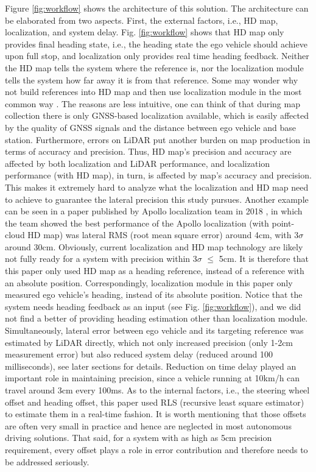 \documentclass[letterpaper, 10 pt, conference]{ieeeconf}
\begin{document}
Figure \ref{fig:workflow} shows the architecture of this solution. The architecture can be elaborated from two aspects. First, the external factors, i.e., HD map, localization, and system delay. Fig. \ref{fig:workflow} shows that HD map only provides final heading state, i.e., the heading state the ego vehicle should achieve upon full stop, and localization only provides real time heading feedback. Neither the HD map tells the system where the reference is, nor the localization module tells the system how far away it is from that reference. Some may wonder why not build references into HD map and then use localization module in the most common way \cite{Durrant2006Simultaneous, Durrantwhyte2006Simultaneous}. The reasons are less intuitive, one can think of that during map collection there is only GNSS-based localization available, which is easily affected by the quality of GNSS signals and the distance between ego vehicle and base station. Furthermore, errors on LiDAR put another burden on map production in terms of accuracy and precision. Thus, HD map's precision and accuracy are affected by both localization and LiDAR performance, and localization performance (with HD map), in turn, is affected by map's accuracy and precision. This makes it extremely hard to analyze what the localization and HD map need to achieve to guarantee the lateral precision this study pursues. Another example can be seen in a paper published by Apollo localization team in 2018 \cite{8461224}, in which the team showed the best performance of the Apollo localization (with point-cloud HD map) was lateral RMS (root mean square error) around 4cm, with 3$\sigma$ around 30cm. Obviously, current localization and HD map technology are likely not fully ready for a system with precision within 3$\sigma$ $\leq$ 5cm. It is therefore that this paper only used HD map as a heading reference, instead of a reference with an absolute position. Correspondingly, localization module in this paper only measured ego vehicle's heading, instead of its absolute position. Notice that the system needs heading feedback as an input (see Fig. \ref{fig:workflow}), and we did not find a better of providing heading estimation other than localization module. Simultaneously, lateral error between ego vehicle and its targeting reference was estimated by LiDAR directly, which not only increased precision (only 1-2cm measurement error) but also reduced system delay (reduced around 100 milliseconds), see later sections for details. Reduction on time delay played an important role in maintaining precision, since a vehicle running at 10km/h can travel around 3cm every 100ms. As to the internal factors, i.e., the steering wheel offset and heading offset, this paper used RLS (recursive least square estimator) \cite{Narayanan2014Methods} to estimate them in a real-time fashion. It is worth mentioning that those offsets are often very small in practice and hence are neglected in most autonomous driving solutions. That said, for a system with as high as 5cm precision requirement, every offset plays a role in error contribution and therefore needs to be addressed seriously.
\end{document}

